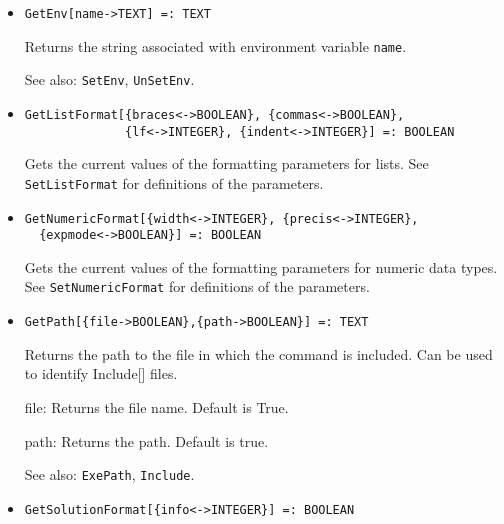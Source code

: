 \begin{itemize}
{\it for} {\tt T = FLOAT, RATIONAL}
\bd
Returns the game on which the parameter is defined.
\ed

\item{}
\protect \large \begin{verbatim}
GetEnv[name->TEXT] =: TEXT
\end{verbatim} \normalsize

\bd
Returns the string associated with environment variable \verb+name+.
\item [See also:] \verb+SetEnv+, \verb+UnSetEnv+.
\ed


\item{}
\protect \large \begin{verbatim}
GetListFormat[{braces<->BOOLEAN}, {commas<->BOOLEAN},
              {lf<->INTEGER}, {indent<->INTEGER}] =: BOOLEAN
\end{verbatim} \normalsize

\bd
Gets the current values of the formatting parameters for lists.  See
\verb+SetListFormat+ for definitions of the parameters. 
\ed

\item{}
\protect \large \begin{verbatim}
GetNumericFormat[{width<->INTEGER}, {precis<->INTEGER}, 
  {expmode<->BOOLEAN}] =: BOOLEAN 
\end{verbatim} \normalsize

\bd 
Gets the current values of the formatting parameters for numeric
data types.  See \verb+SetNumericFormat+ for definitions of the
parameters.  
\ed

\item{}
\protect \large \begin{verbatim}
GetPath[{file->BOOLEAN},{path->BOOLEAN}] =: TEXT 
\end{verbatim} \normalsize

\bd
Returns the path to the file in which the command is included.  Can be
used to identify Include[] files. 
\bd
\item [file:] Returns the file name.  Default is True.  
\item [path:] Returns the path.  Default is true. 
\ed
\item [See also:] \verb+ExePath+, \verb+Include+.
\ed

\item{}
\protect \large \begin{verbatim}
GetSolutionFormat[{info<->INTEGER}] =: BOOLEAN 
\end{verbatim} \normalsize


\end{itemize}
